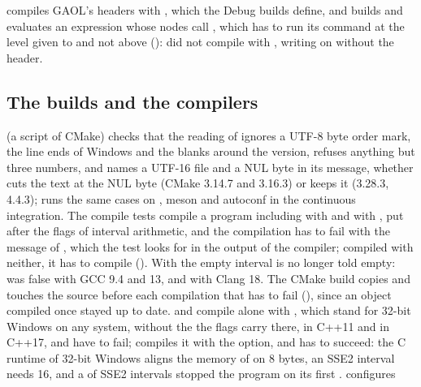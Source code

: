\medskip
{} compiles GAOL's headers with , which
the Debug builds define, and builds and evaluates an expression whose nodes
call , which has to run its command at the level
given to  and not above ():
 did not compile with
, writing on  without the
header.\newinvfive

\subsection{The builds and the compilers}

 (a script of CMake) checks that the reading of
 ignores a UTF-8 byte order mark, the line ends of
Windows and the blanks around the version, refuses anything but three
numbers, and names a UTF-16 file and a NUL byte in its message, whether
 cuts the text at the NUL byte (CMake 3.14.7 and 3.16.3)
or keeps it (3.28.3, 4.4.3);  runs the
same cases on , meson and autoconf in the continuous
integration.\newinvfive{} The compile tests  compile a
program including  with  and
with , put after the flags of interval arithmetic, and
the compilation has to fail with the message of ,
which the test looks for in the output of the compiler; compiled with
neither, it has to compile (). With
 the empty interval is no longer told empty:
 was false with GCC 9.4 and 13, and
with Clang 18. The CMake build copies and touches the source before each
compilation that has to fail (), since an
object compiled once stayed up to date.  and  compile
 alone with , which stand for
32-bit Windows on any system, without the  the flags
carry there, in C++11 and in C++17, and have to fail;
 compiles it with the option, and has to
succeed: the C runtime of 32-bit
Windows aligns the memory of  on 8 bytes, an SSE2 interval needs
16, and a  of SSE2 intervals stopped the program on its
first .\newinvfive{}  configures
